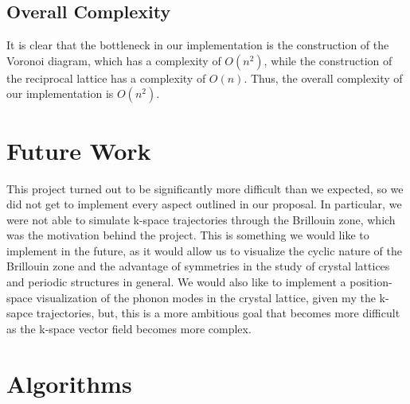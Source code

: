 \documentclass{article}
\begin{document}
\subsection{Overall Complexity}
It is clear that the bottleneck in our implementation is the construction of the Voronoi diagram, which has a complexity of $O(n^2)$, while the construction of the reciprocal lattice has a complexity of $O(n)$. Thus, the overall complexity of our implementation is $O(n^2)$.



\section{Future Work}
This project turned out to be significantly more difficult than we expected, so we did not get to implement every aspect outlined in our proposal. In particular, we were not able to simulate k-space trajectories through the Brillouin zone, which was the motivation behind the project. This is something we would like to implement in the future, as it would allow us to visualize the cyclic nature of the Brillouin zone and the advantage of symmetries in the study of crystal lattices and periodic structures in general. We would also like to implement a position-space visualization of the phonon modes in the crystal lattice, given my the k-sapce trajectories, but, this is a more ambitious goal that becomes more difficult as the k-space vector field becomes more complex. 


\nocite{lecture-notes-mount,lecture_notes_professor,chat-gpt}




\appendix
\section{Algorithms}
\end{document}
